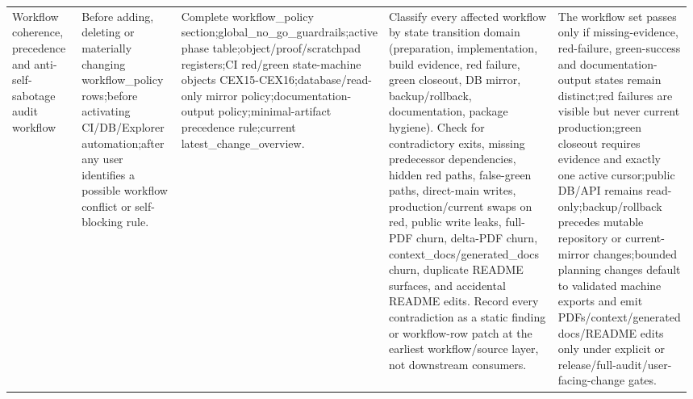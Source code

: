 \begin{longtable}{L{0.14\linewidth} L{0.19\linewidth} L{0.18\linewidth} L{0.31\linewidth} L{0.16\linewidth}}
Workflow coherence, precedence and anti-self-sabotage audit workflow & Before adding, deleting or materially changing workflow\_policy rows;\newline before activating CI/\allowbreak{}DB/\allowbreak{}Explorer automation;\newline after any user identifies a possible workflow conflict or self-blocking rule. & Complete workflow\_policy section;\newline global\_no\_go\_guardrails;\newline active phase table;\newline object/\allowbreak{}proof/\allowbreak{}scratchpad registers;\newline CI red/\allowbreak{}green state-machine objects CEX15-CEX16;\newline database/\allowbreak{}read-only mirror policy;\newline documentation-output policy;\newline minimal-artifact precedence rule;\newline current latest\_change\_overview. & Classify every affected workflow by state transition domain (preparation, implementation, build evidence, red failure, green closeout, DB mirror, backup/\allowbreak{}rollback, documentation, package hygiene). Check for contradictory exits, missing predecessor dependencies, hidden red paths, false-green paths, direct-main writes, production/\allowbreak{}current swaps on red, public write leaks, full-PDF churn, delta-PDF churn, context\_docs/\allowbreak{}generated\_docs churn, duplicate README surfaces, and accidental README edits. Record every contradiction as a static finding or workflow-row patch at the earliest workflow/\allowbreak{}source layer, not downstream consumers. & The workflow set passes only if missing-evidence, red-failure, green-success and documentation-output states remain distinct;\newline red failures are visible but never current production;\newline green closeout requires evidence and exactly one active cursor;\newline public DB/\allowbreak{}API remains read-only;\newline backup/\allowbreak{}rollback precedes mutable repository or current-mirror changes;\newline bounded planning changes default to validated machine exports and emit PDFs/\allowbreak{}context/\allowbreak{}generated docs/\allowbreak{}README edits only under explicit or release/\allowbreak{}full-audit/\allowbreak{}user-facing-change gates.\\

\end{longtable}
